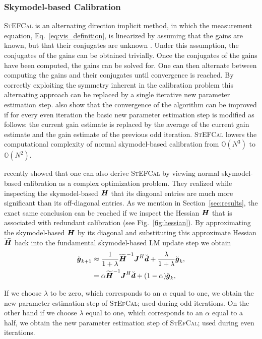 \documentclass[useAMS,usenatbib]{mn2e}
\newcommand{\bg}{\bmath{g}}
\newcommand{\bd}{\bmath{d}}
\newcommand{\bJ}{\bmath{J}}
\newcommand{\bH}{\bmath{H}}
\begin{document}
\subsubsection{Skymodel-based Calibration}
\label{sec:sbc}
\textsc{StEFCal} is an alternating direction implicit method, in which the measurement equation, Eq.~\eqref{eq:vis_definition}, is linearized by assuming that the gains are known, but
that their conjugates are unknown \citep{Mitchell:MWA-cal,Salvini2014}. Under this assumption, the conjugates of the gains can be obtained trivially. Once the conjugates of the gains have been computed, the gains can be solved for. One can then alternate between computing the gains and their conjugates until convergence
is reached. By correctly exploiting the symmetry inherent in the calibration problem this alternating approach can be replaced by a single iterative new parameter estimation step. \cite{Salvini2014} also show that
the convergence of the algorithm can be improved if for every even iteration the basic new parameter estimation step is modified as follows: the current gain estimate is replaced by the average of the current gain estimate and the gain estimate of the previous odd iteration.
\textsc{StEFCal} lowers the computational complexity of normal skymodel-based calibration from $\mathbb{O}(N^3)$ to $\mathbb{O}(N^2)$. 

\citet{Smirnov2015} recently showed that one can also derive \textsc{StEFCal} by viewing normal skymodel-based calibration as a complex optimization problem.
They realized while inspecting the skymodel-based $\bH$ that its diagonal entries are much more significant than its off-diagonal entries.
As we mention in Section~\ref{sec:results}, the exact same conclusion can be reached if we inspect the Hessian $\bH$ that is associated with redundant calibration (see Fig.~\ref{fig:hessian}). 
By approximating the skymodel-based $\bH$ by its diagonal and substituting this approximate Hessian $\widetilde{\bH}$ back into the fundamental skymodel-based LM update step we obtain \citep{Smirnov2015} 
\begin{align}
\breve{\bg}_{k+1} &\approx \frac{1}{1+\lambda}\widetilde{\bH}^{-1}\bJ^H\breve{\bd} + \frac{\lambda}{1+\lambda} \breve{\bg}_k,\label{eq:stef_lambda}\\
 &= \alpha \widetilde{\bH}^{-1}\bJ^H\breve{\bd} + (1-\alpha)\breve{\bg}_k, \label{eq:stef_alpha}  
\end{align}

If we choose $\lambda$ to be zero, which corresponds to an $\alpha$ equal to one, we obtain the new parameter estimation step of \textsc{StEfCal}; used during odd iterations. On the other hand if we choose $\lambda$ equal to one, which corresponds
to an $\alpha$ equal to a half, we obtain the new parameter estimation step of \textsc{StEfCal}; used during even iterations. 
\end{document}
